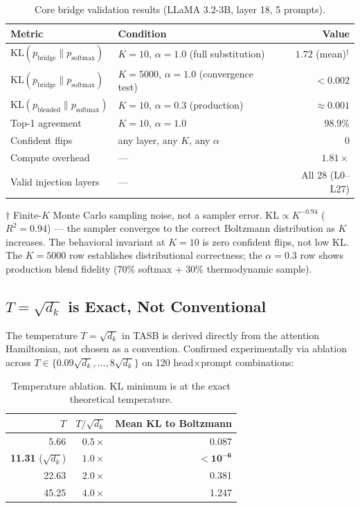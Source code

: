 \documentclass[11pt,a4paper]{article}
\begin{document}
\begin{table}[h]
\centering
\caption{Core bridge validation results (LLaMA 3.2-3B, layer 18, 5 prompts).}
\label{tab:bridge_results}
\begin{tabular}{@{}llr@{}}
\toprule
Metric & Condition & Value \\
\midrule
$\mathrm{KL}(p_\text{bridge} \| p_\text{softmax})$ & $K=10$, $\alpha=1.0$ (full substitution) & $1.72$ (mean)$^\dagger$ \\
$\mathrm{KL}(p_\text{bridge} \| p_\text{softmax})$ & $K=5000$, $\alpha=1.0$ (convergence test) & $<0.002$ \\
$\mathrm{KL}(p_\text{blended} \| p_\text{softmax})$ & $K=10$, $\alpha=0.3$ (production) & $\approx 0.001$ \\
Top-1 agreement & $K=10$, $\alpha=1.0$ & 98.9\% \\
Confident flips & any layer, any $K$, any $\alpha$ & 0 \\
Compute overhead & --- & $1.81\times$ \\
Valid injection layers & --- & All 28 (L0--L27) \\
\bottomrule
\end{tabular}
\end{table}

\noindent$\dagger$ Finite-$K$ Monte Carlo sampling noise, not a sampler error.
$\mathrm{KL} \propto K^{-0.94}$ ($R^2=0.94$) --- the sampler converges to the
correct Boltzmann distribution as $K$ increases. The behavioral invariant at
$K=10$ is zero confident flips, not low KL. The $K=5000$ row establishes
distributional correctness; the $\alpha=0.3$ row shows production blend fidelity
(70\% softmax + 30\% thermodynamic sample).

\subsection{\texorpdfstring{$T = \sqrt{d_k}$ is Exact, Not Conventional}{T = sqrt(dk) is Exact, Not Conventional}}

The temperature $T = \sqrt{d_k}$ in TASB is derived directly from the attention
Hamiltonian, not chosen as a convention. Confirmed experimentally via ablation
across $T \in \{0.09\sqrt{d_k},\ldots,8\sqrt{d_k}\}$ on 120 head$\times$prompt
combinations:

\begin{table}[h]
\centering
\caption{Temperature ablation. KL minimum is at the exact theoretical temperature.}
\label{tab:temperature}
\begin{tabular}{@{}rrr@{}}
\toprule
$T$ & $T/\sqrt{d_k}$ & Mean KL to Boltzmann \\
\midrule
5.66 & $0.5\times$ & 0.087 \\
\textbf{11.31} ($\sqrt{d_k}$) & $\mathbf{1.0\times}$ & $\mathbf{<10^{-6}}$ \\
22.63 & $2.0\times$ & 0.381 \\
45.25 & $4.0\times$ & 1.247 \\
\bottomrule
\end{tabular}
\end{table}
\end{document}
